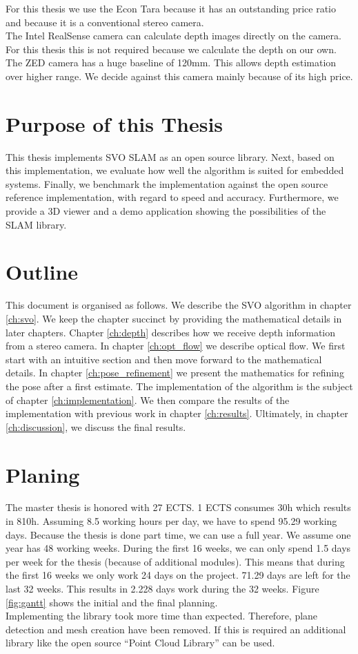\documentclass[11pt,a4paper,titlepage,oneside]{report}
\begin{document}
For this thesis we use the Econ Tara because it has an outstanding price ratio and because it is a conventional stereo camera.\\
The Intel RealSense camera can calculate depth images directly on the camera. For this thesis this is not required because we calculate the depth on our own.\\
The ZED camera has a huge baseline of 120mm. This allows depth estimation over higher range. We decide against this camera mainly because of its high price.

\section{Purpose of this Thesis}

This thesis implements SVO SLAM as an open source library. Next, based on this implementation, we evaluate how well the algorithm is suited for embedded systems. Finally, we benchmark the implementation against the open source reference implementation, with regard to speed and accuracy. Furthermore, we provide a 3D viewer and a demo application showing the possibilities of the SLAM library.

\section{Outline}

This document is organised as follows. We describe the SVO algorithm in chapter \ref{ch:svo}. We keep the chapter succinct by providing the mathematical details in later chapters. Chapter \ref{ch:depth} describes how we receive depth information from a stereo camera. In chapter \ref{ch:opt_flow} we describe optical flow. We first start with an intuitive section and then move forward to the mathematical details. In chapter \ref{ch:pose_refinement} we present the mathematics for refining  the pose after a first estimate. The implementation of the algorithm is the subject of chapter \ref{ch:implementation}. We then compare the results of the implementation with previous work in chapter \ref{ch:results}. Ultimately, in chapter \ref{ch:discussion}, we discuss the final results.

\section{Planing}
The master thesis is honored with 27 ECTS. 1 ECTS consumes 30h which results in 810h. Assuming 8.5 working hours per day, we have to spend 95.29 working days. Because the thesis is done part time, we can use a full year. We assume one year has 48 working weeks. During the first 16 weeks, we can only spend 1.5 days per week for the thesis (because of additional modules). This means that during the first 16 weeks we only work 24 days on the project. 71.29 days are left for the last 32 weeks. This results in 2.228 days work during the 32 weeks. Figure \ref{fig:gantt} shows the initial and the final planning.\\
Implementing the library took more time than expected. Therefore, plane detection and mesh creation have been removed. If this is required an additional library like the open source ``Point Cloud Library'' \cite{pcl} can be used.
\end{document}
